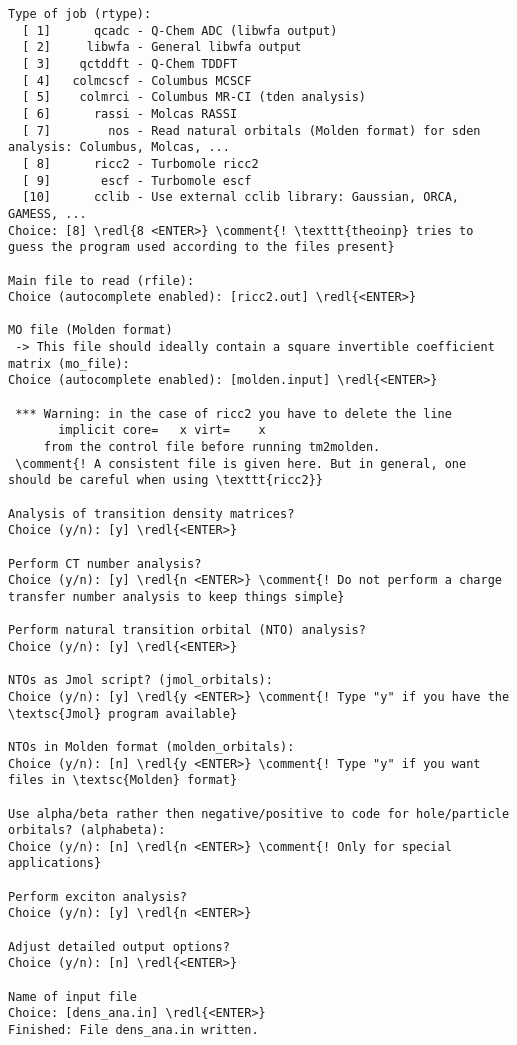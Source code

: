\documentclass[DIV=12,headings=normal]{scrartcl}
\newcommand\Cline[2][red]{{\sbox\MBox{#2}%
  \rlap{\usebox\MBox}\color{#1}\rule[-1.2\dp\MBox]{\wd\MBox}{0.5pt}}}
\newcommand{\comment}[1]{\textcolor{blue}{#1}}
\newcommand{\redl}[1]{\Cline{\textcolor{red}{#1}}}
\newcounter{number}
\begin{document}
\scriptsize
\begin{Verbatim}[commandchars=\\\{\}]
Type of job (rtype):
  [ 1]      qcadc - Q-Chem ADC (libwfa output)
  [ 2]     libwfa - General libwfa output
  [ 3]    qctddft - Q-Chem TDDFT
  [ 4]   colmcscf - Columbus MCSCF
  [ 5]    colmrci - Columbus MR-CI (tden analysis)
  [ 6]      rassi - Molcas RASSI
  [ 7]        nos - Read natural orbitals (Molden format) for sden analysis: Columbus, Molcas, ...
  [ 8]      ricc2 - Turbomole ricc2
  [ 9]       escf - Turbomole escf
  [10]      cclib - Use external cclib library: Gaussian, ORCA, GAMESS, ...
Choice: [8] \redl{8 <ENTER>} \comment{! \texttt{theoinp} tries to guess the program used according to the files present}

Main file to read (rfile):
Choice (autocomplete enabled): [ricc2.out] \redl{<ENTER>}

MO file (Molden format)
 -> This file should ideally contain a square invertible coefficient matrix (mo_file):
Choice (autocomplete enabled): [molden.input] \redl{<ENTER>}

 *** Warning: in the case of ricc2 you have to delete the line
       implicit core=   x virt=    x
     from the control file before running tm2molden.
 \comment{! A consistent file is given here. But in general, one should be careful when using \texttt{ricc2}}

Analysis of transition density matrices?
Choice (y/n): [y] \redl{<ENTER>}

Perform CT number analysis?
Choice (y/n): [y] \redl{n <ENTER>} \comment{! Do not perform a charge transfer number analysis to keep things simple}

Perform natural transition orbital (NTO) analysis?
Choice (y/n): [y] \redl{<ENTER>}

NTOs as Jmol script? (jmol_orbitals):
Choice (y/n): [y] \redl{y <ENTER>} \comment{! Type "y" if you have the \textsc{Jmol} program available}

NTOs in Molden format (molden_orbitals):
Choice (y/n): [n] \redl{y <ENTER>} \comment{! Type "y" if you want files in \textsc{Molden} format}

Use alpha/beta rather then negative/positive to code for hole/particle orbitals? (alphabeta):
Choice (y/n): [n] \redl{n <ENTER>} \comment{! Only for special applications}

Perform exciton analysis?
Choice (y/n): [y] \redl{n <ENTER>}

Adjust detailed output options?
Choice (y/n): [n] \redl{<ENTER>}

Name of input file
Choice: [dens_ana.in] \redl{<ENTER>}
Finished: File dens_ana.in written.
\end{Verbatim}
\normalsize
\end{document}
